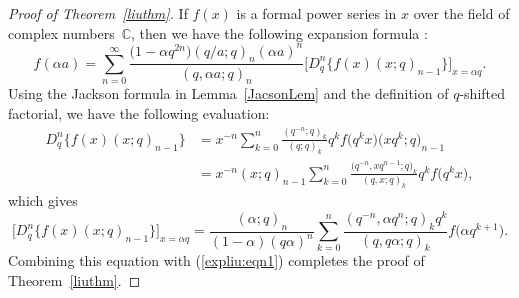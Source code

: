 \documentclass[pdftex]{sigma}
\numberwithin{equation}{section}
\begin{document}
 \begin{proof} [Proof of Theorem~\ref{liuthm}] If $f(x)$ is a formal power series in $x$ over the field of complex numbers~$\mathbb{C}$, then we have the following expansion formula \cite[Theorem~2]{Liu2002}:
	\begin{equation}\label{expliu:eqn1}
		f(\alpha a)=\sum_{n=0}^\infty \frac{\bigl(1-\alpha q^{2n}\bigr)(q/a; q)_n (\alpha a)^n}{(q, \alpha a;
			q)_n}\bigl[ {D}^n_{q}\{f(x)(x; q)_{n-1}\} \bigr]_{x=\alpha q}.
\end{equation}		
Using the Jackson formula in Lemma~\ref{JacsonLem} and the definition of $q$-shifted factorial, we have the following evaluation:
	\begin{align*}
		{D}^n_{q}\{f(x)(x; q)_{n-1}\} &{}=x^{-n}\sum_{k=0}^n \frac{(q^{-n}; q)_k}{(q; q)_k}q^k f\bigl(q^k x\bigr)\bigl(xq^k; q\bigr)_{n-1}\\
		&{}=x^{-n} (x; q)_{n-1}\sum_{k=0}^n \frac{\bigl(q^{-n}, xq^{n-1}; q\bigr)_k}{(q, x; q)_k}q^k f\bigl(q^k x\bigr),
	\end{align*}	
	which gives
	\[
	\bigl[ {D}^n_{q}\{f(x)(x; q)_{n-1}\} \bigr]_{x=\alpha q}
	=\frac{({\alpha}; q)_n }{(1-\alpha)(q\alpha)^{n}}
	\sum_{k=0}^n \frac{(q^{-n}, \alpha q^n; q)_k q^k}
	{(q, q\alpha; q)_k} f\bigl(\alpha q^{k+1}\bigr).
	\]
	Combining this equation with (\ref{expliu:eqn1}) completes the proof of Theorem~\ref{liuthm}.
 \end{proof}
\end{document}
